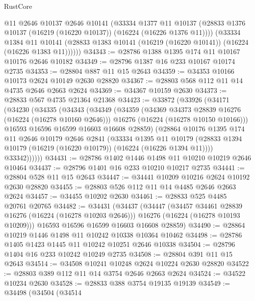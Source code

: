 \begin{lexlean}{RustCore}
\begin{coremodule}
        @11
        @2646
        @10137
        @2646
        @10141
        (@33334
          @1377
          @11
          @10137
          (@28833 @1376 @10137 (@16219 (@16220 @10137)) (@16224 (@16226 @1376 @11))))
        (@33334
          @1384
          @11
          @10141
          (@28833 @1383 @10141 (@16219 (@16220 @10141)) (@16224 (@16226 @1383 @11))))))
@34343 := @28786 @1388 @1395 @174 @11 @10167 @10176 @2646 @10182
@34349 := @28796 @1387 @16 @233 @10167 @10174 @2735
@34353 := @28804 @887 @11 @15 @2643
@34359 := @34353 @10166 @10173 @2624 @10149 @2630 @28820
@34367 := @28803 @568 @112 @11 @14 @4735 @2646 @2663 @2624
@34369 := @34367 @10159 @2630
@34373 := @28833 @567 @4735 @21364 @21368
@34423 := @33872
    (@33926
      (@34171
        (@34230
          (@34335
            (@34343
              (@34349
                (@34359
                  (@34369 @34373 @28839 @16276 (@16224 (@16278 @10160 @2646)))
                  @16276
                  (@16224 (@16278 @10150 @10166)))
                @16593
                @16596
                @16599
                @16603
                @16608
                @28859)
              (@28864
                @10176
                @1395
                @174
                @11
                @2646
                @10179
                @2646
                @2841
                (@33334
                  @1395
                  @11
                  @10179
                  (@28833 @1394 @10179 (@16219 (@16220 @10179)) (@16224 (@16226 @1394 @11))))
                @33342))))))
@34431 := @28786 @1402 @1446 @1498 @11 @10210 @10219 @2646 @10464
@34437 := @28796 @1401 @16 @233 @10210 @10217 @2735
@34441 := @28804 @528 @11 @15 @2643
@34447 := @34441 @10209 @10216 @2624 @10192 @2630 @28820
@34455 := @28803 @526 @112 @11 @14 @4485 @2646 @2663 @2624
@34457 := @34455 @10202 @2630
@34461 := @28833 @525 @4485 @20761 @20765
@34482 := @34431
    (@34437
      (@34447
        (@34457 @34461 @28839 @16276 (@16224 (@16278 @10203 @2646)))
        @16276
        (@16224 (@16278 @10193 @10209)))
      @16593
      @16596
      @16599
      @16603
      @16608
      @28859)
@34490 := @28864 @10219 @1446 @1498 @11 @10242 @10338 @10364 @10462
@34498 := @28786 @1405 @1423 @1445 @11 @10242 @10251 @2646 @10338
@34504 := @28796 @1404 @16 @233 @10242 @10249 @2735
@34508 := @28804 @391 @11 @15 @2643
@34514 := @34508 @10241 @10248 @2624 @10224 @2630 @28820
@34522 := @28803 @389 @112 @11 @14 @3754 @2646 @2663 @2624
@34524 := @34522 @10234 @2630
@34528 := @28833 @388 @3754 @19135 @19139
@34549 := @34498
    (@34504
      (@34514

\end{coremodule}
\end{lexlean}
